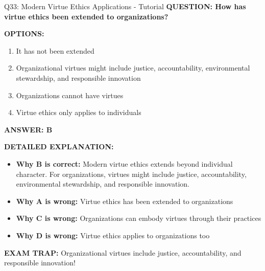 \documentclass[8pt]{beamer}
\begin{document}
	\begin{frame}{Q33: Modern Virtue Ethics Applications - Tutorial}
		\fontsize{6.5}{7.5}\selectfont
		\textbf{QUESTION: How has virtue ethics been extended to organizations?}
		
		\vspace{0.1cm}
		\textbf{OPTIONS:}
		\begin{enumerate}
			\item It has not been extended
			\item Organizational virtues might include justice, accountability, environmental stewardship, and responsible innovation
			\item Organizations cannot have virtues
			\item Virtue ethics only applies to individuals
		\end{enumerate}
		
		\vspace{0.1cm}
		\textcolor{myblue}{\textbf{ANSWER: B}}
		
		\vspace{0.1cm}
		\textbf{DETAILED EXPLANATION:}
		\begin{itemize}
			\item \textbf{Why B is correct:} Modern virtue ethics extends beyond individual character. For organizations, virtues might include justice, accountability, environmental stewardship, and responsible innovation.
			\item \textbf{Why A is wrong:} Virtue ethics has been extended to organizations
			\item \textbf{Why C is wrong:} Organizations can embody virtues through their practices
			\item \textbf{Why D is wrong:} Virtue ethics applies to organizations too
		\end{itemize}
		
		\textcolor{myred}{\textbf{EXAM TRAP:}} Organizational virtues include \textcolor{myblue}{justice, accountability, and responsible innovation}!
	\end{frame}
	
\end{document}
